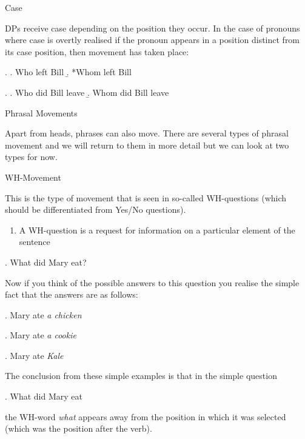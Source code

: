 \begin{frame}
{Case}

DPs receive case depending on the position they occur.  In the case of pronouns where case is overtly realised if the pronoun appears in a position distinct from its case position, then movement has taken place:

\ex. 
\a. Who left Bill
\b. *Whom left Bill


\ex.
\a. Who did Bill leave
\b. Whom did Bill leave


  
\end{frame}


\begin{frame}
  {Phrasal Movements}


Apart from heads, phrases can also move.  There are several types of phrasal movement and we will return to them in more detail but we can look at two types for now.

\end{frame}


\begin{frame}
  {WH-Movement}

This is the type of movement that is seen in so-called WH-questions (which should be differentiated from Yes/No questions).

\begin{enumerate}
\item A WH-question is a request for information on a particular element of the sentence
\end{enumerate}

\ex.
What did Mary eat?

Now if you think of the possible answers to this question you realise the simple fact that the answers are as follows:


\end{frame}


\begin{frame}

  \ex. Mary ate \textit{a chicken}

\ex. Mary ate \textit{a cookie}

\ex.  Mary ate \textit{Kale}


\end{frame}


\begin{frame}
  The conclusion from these simple examples is that in the simple question 

\ex. 
What did Mary eat


the WH-word \textit{what} appears away from the position in which it was selected (which was the position after the verb).


\end{frame}

